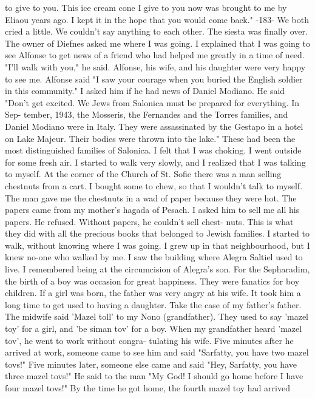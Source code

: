 to give to you.
This ice cream cone I give to you now was brought to me 
by Eliaou years ago.
I kept it in the hope that you would come back."
-183- 
We both cried a little.
We couldn't say anything to each other.
The siesta was finally over.
The owner of Diefnes asked me where I 
was going.
I explained that I was going to see Alfonse to get news of a 
friend who had helped me greatly in a time of need.
"I'll walk with you," he said.
Alfonse, his wife, and his daughter were very happy to see me.
Alfonse said "I saw your courage when you buried the English soldier in 
this community."
I asked him if he had news of Daniel Modiano.
He said "Don't get 
excited.
We Jews from Salonica must be prepared for everything.
In Sep-
tember, 1943, the Mosseris, the Fernandes and the Torres families, and 
Daniel Modiano were in Italy.
They were assassinated by the Gestapo in 
a hotel on Lake Majeur.
Their bodies were thrown into the lake."
These had been the most distinguished families of Salonica.
I felt 
that I was choking.
I went outside for some fresh air.
I started to 
walk very slowly, and I realized that I was talking to myself.
At the 
corner of the Church of St.
Sofie there was a man selling chestnuts from 
a cart.
I bought some to chew, so that I wouldn't talk to myself.
The man gave me the chestnuts in a wad of paper because they were hot.
The papers came from my mother's hagada of Pesach.
I asked him to sell 
me all his papers.
He refused.
Without papers, he couldn't sell chest-
nuts.
This is what they did with all the precious books that belonged to 
Jewish families.
I started to walk, without knowing where I was going.
I grew up in 
that neighbourhood, but I knew no-one who walked by me.
I saw the building where Alegra Saltiel used to live.
I remembered being at the circumcision of Alegra's son.
For the Sepharadim, the birth of a boy was 
occasion for great happiness.
They were fanatics for boy children.
If 
a girl was born, the father was very angry at his wife.
It took him a 
long time to get used to having a daughter.
Take the case of my father's 
father.
The midwife said 'Mazel toll' to my Nono (grandfather).
They used to say 'mazel toy' for a girl, and 'be siman tov' for a boy.
When my grandfather heard 'mazel tov', he went to work without congra-
tulating his wife.
Five minutes after he arrived at work, someone came to see him and said "Sarfatty, you have two mazel tovs!"
Five minutes 
later, someone else came and said "Hey, Sarfatty, you have three mazel 
tovs!"
He said to the man "My God!
I should go home before I have four 
mazel tovs!"
By the time he got home, the fourth mazel toy had arrived 
